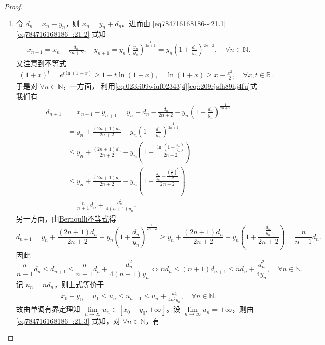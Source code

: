 \documentclass[../../main.tex]{subfiles}%
\begin{document}
\begin{proof}
\begin{enumerate}[(1)]
\item 令 $d_n = x_n - y_n$，则 $x_n = y_n + d_n$。进而由 \eqref{eq784716168186--:21.1} \eqref{eq784716168186--:21.2} 式知
\begin{align}
x_{n+1} = x_n - \frac{d_n}{2n+2},\quad y_{n+1} = y_n \left( \frac{x_n}{y_n} \right)^{\frac{1}{2n+2}} = y_n \left( 1 + \frac{d_n}{y_n} \right)^{\frac{1}{2n+2}},\quad \forall n \in \mathbb{N}.\label{eq:023ri09wiuf02343j4}
\end{align}
又注意到不等式
\begin{align}
(1+x)^t = e^{t\ln(1+x)} \geqslant 1 + t\ln(1+x),\quad \ln(1+x) \geqslant x - \frac{x^2}{2},\quad \forall x,t \in \mathbb{R}.\label{eq::209rjsfh89hj4fu}
\end{align}
于是对 $\forall n \in \mathbb{N}$，一方面，
利用\eqref{eq:023ri09wiuf02343j4}\eqref{eq::209rjsfh89hj4fu}式我们有
\begin{align*}
d_{n+1} &= x_{n+1} - y_{n+1} = y_n + d_n - \frac{d_n}{2n+2} - y_n \left( 1 + \frac{d_n}{y_n} \right)^{\frac{1}{2n+2}} \\
&= y_n + \frac{(2n+1)d_n}{2n+2} - y_n \left( 1 + \frac{d_n}{y_n} \right)^{\frac{1}{2n+2}} \\
&\leqslant y_n + \frac{(2n+1)d_n}{2n+2} - y_n \left( 1 + \frac{\ln\left(1 + \frac{d_n}{y_n}\right)}{2n+2} \right) \\
&\leqslant y_n + \frac{(2n+1)d_n}{2n+2} - y_n \left( 1 + \frac{\frac{d_n}{y_n} - \frac{\left(\frac{d_n}{y_n}\right)^2}{2}}{2n+2} \right) \\
&= \frac{n}{n+1}d_n + \frac{d_n^2}{4(n+1)y_n}.
\end{align*}
另一方面，由\hyperref[theorem:Bernoulli不等式]{Bernoulli不等式}得
\[
d_{n+1} = y_n + \frac{(2n+1)d_n}{2n+2} - y_n \left( 1 + \frac{d_n}{y_n} \right)^{\frac{1}{2n+2}} \geqslant y_n + \frac{(2n+1)d_n}{2n+2} - y_n \left( 1 + \frac{\frac{d_n}{y_n}}{2n+2} \right) = \frac{n}{n+1}d_n.
\]
因此
\[
\frac{n}{n+1}d_n \leqslant d_{n+1} \leqslant \frac{n}{n+1}d_n + \frac{d_n^2}{4(n+1)y_n} \Longleftrightarrow nd_n \leqslant (n+1)d_{n+1} \leqslant nd_n + \frac{d_n^2}{4y_n},\quad \forall n \in \mathbb{N}.
\]
记 $u_n = nd_n$，则上式等价于
\begin{align}
x_0 - y_0 = u_1 \leqslant u_n \leqslant u_{n+1} \leqslant u_n + \frac{u_n^2}{4n^2 y_n},\quad \forall n \in \mathbb{N}. \label{eq784716168186--:21.3}
\end{align}
故由单调有界定理知 $\lim\limits_{n \to \infty} u_n \in [x_0 - y_0, +\infty]$。设 $\lim\limits_{n \to \infty} u_n = +\infty$，则由 \eqref{eq784716168186--:21.3} 式知，对 $\forall n \in \mathbb{N}$，有

\end{enumerate}
\end{proof}
\end{document}
